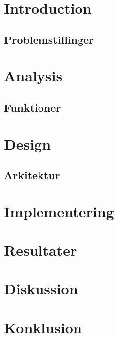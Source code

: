 \documentclass{article}
\begin{document}
\section{Introduction}
\subsection{Problemstillinger}

\section{Analysis}
\subsection{Funktioner}

\section{Design}
\subsection{Arkitektur}

\section{Implementering}

\section{Resultater}

\section{Diskussion}

\section{Konklusion}
\end{document}
